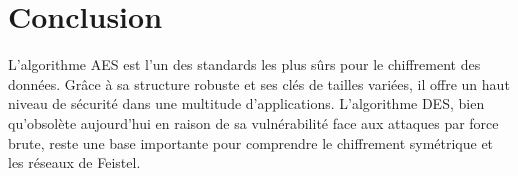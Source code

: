 \documentclass[12pt,a4paper]{article}
\begin{document}
\newpage

\section{Conclusion}
L'algorithme AES est l'un des standards les plus sûrs pour le chiffrement des données. Grâce à sa structure robuste et ses clés de tailles variées, il offre un haut niveau de sécurité dans une multitude d'applications. L'algorithme DES, bien qu'obsolète aujourd'hui en raison de sa vulnérabilité face aux attaques par force brute, reste une base importante pour comprendre le chiffrement symétrique et les réseaux de Feistel.
\end{document}

